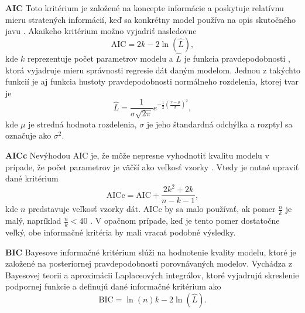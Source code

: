 \textbf{AIC}
\newline
Toto kritérium je založené na koncepte informácie a poskytuje relatívnu mieru stratených informácií, keď sa konkrétny model používa na opis skutočného javu \cite{emiliano:stand_crit:2014}. Akaikeho kritérium možno vyjadriť nasledovne
\begin{equation}
	\text{AIC} = 2k - 2\ln\left( \hat{L} \right),
\end{equation}
kde $ k $ reprezentuje počet parametrov modelu a $ \hat{L} $ je funkcia pravdepodobnosti
, ktorá vyjadruje mieru správnosti regresie dát daným modelom. Jednou z takýchto funkcií je aj funkcia hustoty pravdepodobnosti normálneho rozdelenia, ktorej tvar je 
\begin{equation}
	\hat{L} = \frac{1}{\sigma \sqrt{2\pi}}e^{-\frac{1}{2}\left( \frac{x - \mu}{\sigma} \right)^2},
\end{equation}
kde $ \mu $ je stredná hodnota rozdelenia, $ \sigma $ je jeho štandardná odchýlka a rozptyl sa označuje ako $ \sigma^2 $.

\textbf{AICc}
\newline
Nevýhodou AIC je, že môže nepresne vyhodnotiť kvalitu modelu v prípade, že počet parametrov je väčší ako veľkosť vzorky \cite{emiliano:stand_crit:2014}. Vtedy je nutné upraviť dané kritérium
\begin{equation}
	\text{AICc} = \text{AIC} + \frac{2k^2 + 2k}{n - k - 1}, 
\end{equation}
kde $ n $ predstavuje veľkosť vzorky dát. AICc by sa malo používať, ak pomer $ \frac{n}{k} $ je malý, napríklad $ \frac{n}{k} < 40$ \cite{kenneth:understanding_stand_crit:2004}. V opačnom prípade, keď je tento pomer dostatočne veľký, obe informačné kritéria by mali vracať podobné výsledky.

\textbf{BIC}
\newline
Bayesove informačné kritérium slúži na hodnotenie kvality modelu, ktoré je založené na posteriornej pravdepodobnosti porovnávaných modelov.
Vychádza z Bayesovej teorii a aproximácii Laplaceových integrálov, ktoré vyjadrujú skreslenie podpornej funkcie \cite{emiliano:stand_crit:2014} a definujú dané informačné kritérium ako
\begin{equation}
	\text{BIC} = \ln\left( n \right)k - 2\ln\left( \hat{L} \right).
\end{equation}

